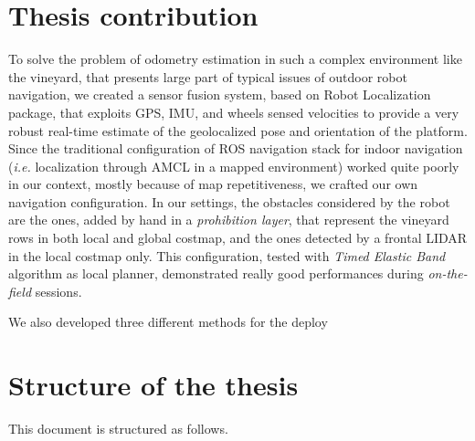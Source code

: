 \section{Thesis contribution}
To solve the problem of odometry estimation in such a complex environment like the vineyard, that presents large part of typical issues of outdoor robot navigation, we created a sensor fusion system, based on Robot Localization package, that exploits GPS, \ac{IMU}, and wheels sensed velocities to provide a very robust real-time estimate of the geolocalized pose and orientation of the platform. Since the traditional configuration of \ac{ROS} navigation stack for indoor navigation (\textit{i.e.} localization through \ac{AMCL} in a mapped environment) worked quite poorly in our context, mostly because of map repetitiveness, we crafted our own navigation configuration. In our settings, the obstacles considered by the robot are the ones, added by hand in a \textit{prohibition layer}, that represent the vineyard rows in both local and global costmap, and the ones detected by a frontal \ac{LIDAR} in the local costmap only. 
This configuration, tested with \textit{Timed Elastic Band} algorithm as local planner, demonstrated really good performances during \textit{on-the-field} sessions.
\par We also developed three different methods for the deploy



\section{Structure of the thesis}
This document is structured as follows.

